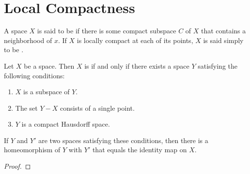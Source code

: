 \documentclass[../main.tex]{subfiles}
\begin{document}
\section{Local Compactness}

\begin{definition}{}{}
A space $X$ is said to be  if there is some compact subspace $C$ of $X$ that contains a neighborhood of $x$. If $X$ is locally compact at each of its points, $X$ is said simply to be .
\end{definition}
\begin{theorem}{}{}
Let $X$ be a space. Then $X$ is  if and only if there exists a space $Y$ satisfying the following conditions:
\begin{enumerate}
    \item $X$ is a subspace of $Y$.
    \item The set $Y - X$ consists of a single point.
    \item $Y$ is a compact Hausdorff space.
\end{enumerate}
If $Y$ and $Y'$ are two spaces satisfying these conditions, then there is a homeomorphism of $Y$ with $Y'$ that equals the identity map on $X$.
\end{theorem}
\begin{proof}
    
\end{proof}
\end{document}
